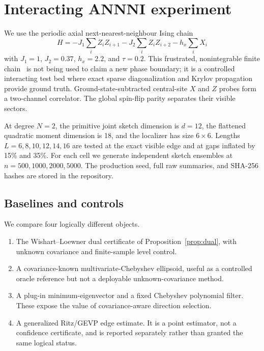 \documentclass[11pt]{article}
\begin{document}
\section{Interacting ANNNI experiment}

We use the periodic axial next-nearest-neighbour Ising chain
\begin{equation}
 H=-J_1\sum_i Z_iZ_{i+1}-J_2\sum_i Z_iZ_{i+2}-h_x\sum_iX_i
 \label{eq:annni}
\end{equation}
with $J_1=1$, $J_2=0.37$, $h_x=2.2$, and $\tau=0.2$.  This frustrated,
nonintegrable finite chain~\cite{Kriel2014} is not being used to claim a new phase boundary; it
is a controlled interacting test bed where exact sparse diagonalization and
Krylov propagation provide ground truth.  Ground-state-subtracted central-site
$X$ and $Z$ probes form a two-channel correlator.  The global spin-flip parity
separates their visible sectors.

At degree $N=2$, the primitive joint sketch dimension is $d=12$, the flattened
quadratic moment dimension is 18, and the localizer has size $6\times6$.
Lengths $L=6,8,10,12,14,16$ are tested at the exact visible edge and at gaps
inflated by 15\% and 35\%.  For each cell we generate independent sketch
ensembles at $n=500,1000,2000,5000$.  The production seed, full raw summaries,
and SHA-256 hashes are stored in the repository.

\subsection{Baselines and controls}

We compare four logically different objects.
\begin{enumerate}
 \item The Wishart--Loewner dual certificate of Proposition~\ref{prop:dual}, with unknown
 covariance and finite-sample level control.
 \item A covariance-known multivariate-Chebyshev ellipsoid, useful as a
 controlled oracle reference but not a deployable unknown-covariance method.
 \item A plug-in minimum-eigenvector and a fixed Chebyshev polynomial filter.
 These expose the value of covariance-aware direction selection.
 \item A generalized Ritz/GEVP edge estimate.  It is a point estimator, not a
 confidence certificate, and is reported separately rather than granted the
 same logical status.
\end{enumerate}
\end{document}
